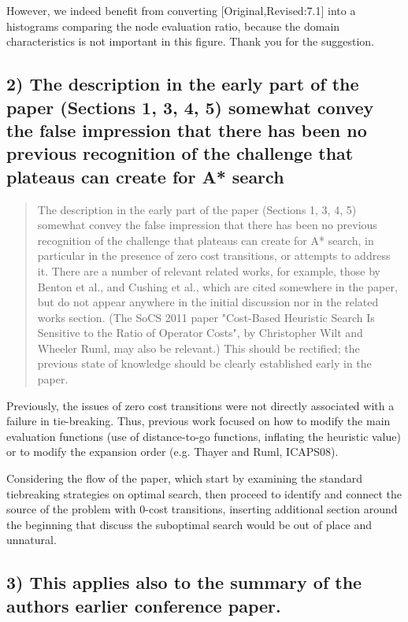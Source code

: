 \documentclass{article}
\begin{document}
However, we indeed benefit from converting [Original,Revised:7.1] into a histograms
comparing the node evaluation ratio, because the domain characteristics is not important
in this figure. Thank you for the suggestion.

\subsection{2) The description in the early part of the paper (Sections 1, 3, 4, 5) somewhat convey the false impression that there has been no previous recognition of the challenge that plateaus can create for A* search}
\label{sec:orgheadline27}

\begin{quote}
 The description in the early part of the paper (Sections 1, 3, 4, 5)
somewhat convey the false impression that there has been no previous
recognition of the challenge that plateaus can create for A* search,
in particular in the presence of zero cost transitions, or attempts to
address it. There are a number of relevant related works, for example,
those by Benton et al., and Cushing et al., which are cited somewhere
in the paper, but do not appear anywhere in the initial discussion nor
in the related works section. (The SoCS 2011 paper "Cost-Based
Heuristic Search Is Sensitive to the Ratio of Operator Costs", by
Christopher Wilt and Wheeler Ruml, may also be relevant.) This should
be rectified; the previous state of knowledge should be clearly
established early in the paper.
\end{quote}

Previously, the issues of zero cost transitions were not directly associated with 
a failure in tie-breaking. Thus, previous work focused on how to modify the main 
evaluation functions (use of distance-to-go functions, inflating the heuristic value)
or to modify the expansion order (e.g. Thayer and Ruml, ICAPS08).

Considering the flow of the paper,
which start by examining the standard tiebreaking strategies on optimal search,
then proceed to identify and connect the source of the problem with 0-cost transitions,
inserting additional section around the beginning that discuss the suboptimal search
would be out of place and unnatural.

\subsection{3) This applies also to the summary of the authors earlier conference paper.}
\label{sec:orgheadline28}
\end{document}
